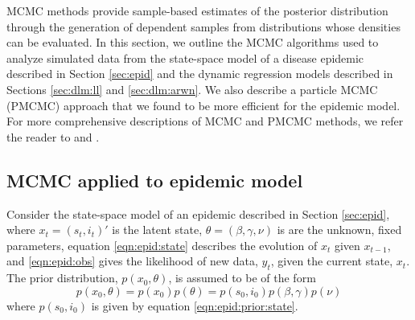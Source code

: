 MCMC methods provide sample-based estimates of the posterior distribution through the generation of dependent samples from distributions whose densities can be evaluated. In this section, we outline the MCMC algorithms used to analyze simulated data from the state-space model of a disease epidemic described in Section \ref{sec:epid} and the dynamic regression models described in Sections \ref{sec:dlm:ll} and \ref{sec:dlm:arwn}. We also describe a particle MCMC (PMCMC) approach that we found to be more efficient for the epidemic model. For more comprehensive descriptions of MCMC and PMCMC methods, we refer the reader to \citet{Robe:Case:mont:2004} and \citet{Andr:Douc:Hol:pmcmc:2010}.

\subsection{MCMC applied to epidemic model \label{sec:mcmc:epid}}

Consider the state-space model of an epidemic described in Section \ref{sec:epid}, where $x_t = (s_t,i_t)'$ is the latent state, $\theta = (\beta,\gamma,\nu)$ is are the unknown, fixed parameters, equation \eqref{eqn:epid:state} describes the evolution of $x_t$ given $x_{t-1}$, and \eqref{eqn:epid:obs} gives the likelihood of new data, $y_t$, given the current state, $x_t$. The prior distribution, $p(x_0,\theta)$, is assumed to be of the form
\begin{equation}
p(x_0,\theta) = p(x_0)p(\theta) = p(s_0,i_0)p(\beta,\gamma)p(\nu) \label{eqn:epid:prior}
\end{equation}
where $p(s_0,i_0)$ is given by equation \eqref{eqn:epid:prior:state}.

